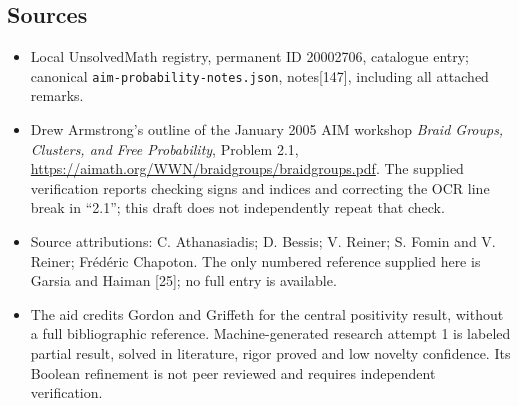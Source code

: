 \documentclass[11pt]{article}
\begin{document}
\subsection{Sources}
\begin{itemize}
\item Local UnsolvedMath registry, permanent ID 20002706, catalogue entry; canonical \texttt{aim-probability-notes.json}, notes[147], including all attached remarks.
\item Drew Armstrong's outline of the January 2005 AIM workshop \emph{Braid Groups, Clusters, and Free Probability}, Problem 2.1, \url{https://aimath.org/WWN/braidgroups/braidgroups.pdf}. The supplied verification reports checking signs and indices and correcting the OCR line break in ``2.1''; this draft does not independently repeat that check.
\item Source attributions: C. Athanasiadis; D. Bessis; V. Reiner; S. Fomin and V. Reiner; Fr\'ed\'eric Chapoton. The only numbered reference supplied here is Garsia and Haiman [25]; no full entry is available.
\item The aid credits Gordon and Griffeth for the central positivity result, without a full bibliographic reference. Machine-generated research attempt 1 is labeled partial result, solved in literature, rigor proved and low novelty confidence. Its Boolean refinement is not peer reviewed and requires independent verification.
\end{itemize}
\end{document}
